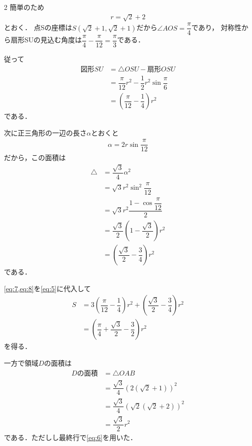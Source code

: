 \documentclass[../../main.tex]{subfiles}
\begin{document}
\begin{multicols}{2}
  簡単のため
  \begin{align}
    r=\sqrt{2}+2 \label{eq:6}
  \end{align}
  とおく．
  点Sの座標は$S(\sqrt{2}+1,\sqrt{2}+1)$だから$\angle AOS=\dfrac{\pi}{4}$であり，
  対称性から扇形SUの見込む角度は$\dfrac{\pi}{4}-\dfrac{\pi}{12}=\dfrac{\pi}{3}$である．

  従って
  \begin{align}
    \text{図形}SU
    & = \triangle OSU - \text{扇形}OSU                                   \\
    & = \dfrac{\pi}{12}r^2 - \dfrac{1}{2}r^2\sin\dfrac{\pi}{6}            \\
    & = \left(\dfrac{\pi}{12}-\dfrac{1}{4}\right)r^2 \label{eq:7}
  \end{align}
  である．

  次に正三角形の一辺の長さ$\alpha$とおくと
  \begin{align}
    \alpha = 2r \sin\dfrac{\pi}{12}
  \end{align}
  だから，この面積は
  \begin{align}
    \triangle
    & = \dfrac{\sqrt{3}}{4}\alpha^2                                         \\
    & = \sqrt{3}r^2\sin^2\dfrac{\pi}{12}                                    \\
    & = \sqrt{3}r^2\dfrac{1-\cos\dfrac{\pi}{12}}{2}                          \\
    & = \dfrac{\sqrt{3}}{2}\left(1-\dfrac{\sqrt{3}}{2}\right)r^2             \\
    & = \left(\dfrac{\sqrt{3}}{2}-\dfrac{3}{4}\right)r^2 \label{eq:8}
  \end{align}
  である．

  \cref{eq:7,eq:8}を\cref{eq:5}に代入して
  \begin{align}
    S
    & = 3\left(\dfrac{\pi}{12}-\dfrac{1}{4}\right)r^2 +\left(\dfrac{\sqrt{3}}{2}-\dfrac{3}{4}\right)r^2 \\
    & = \left(\dfrac{\pi}{4} + \dfrac{\sqrt{3}}{2}-\dfrac{3}{2}\right)r^2 \label{eq:9}
  \end{align}
  を得る．

  一方で領域$D$の面積は
  \begin{align}
    D\text{の面積}
    & = \triangle OAB                              \\
    & = \dfrac{\sqrt{3}}{4}(2(\sqrt{2}+1))^2        \\
    & = \dfrac{\sqrt{3}}{4}(\sqrt{2}(\sqrt{2}+2))^2 \\
    & = \dfrac{\sqrt{3}}{2}r^2
  \end{align}
  である．ただしし最終行で\cref{eq:6}を用いた．


\end{multicols}
\end{document}
